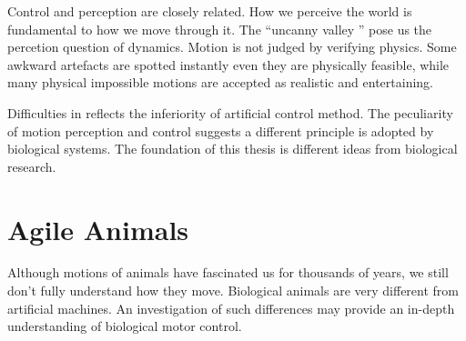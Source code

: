 Control and perception are closely related.
How we perceive the world is fundamental to how we move through it.
The ``uncanny valley '' pose us the percetion question of dynamics.
Motion is not judged by verifying physics.
Some awkward artefacts are spotted instantly even they are physically feasible, while many physical impossible motions are accepted as realistic and entertaining. 



Difficulties in \cms reflects the inferiority of artificial control method.
The peculiarity of motion perception and control suggests a different principle is adopted by biological systems.
The foundation of this thesis is different ideas from biological research.

 

\section{Agile Animals}
Although motions of animals have fascinated us for thousands of years, we still don't fully understand how they move.
Biological animals are very different from artificial machines.
An investigation of such differences may provide an in-depth understanding of biological motor control.

